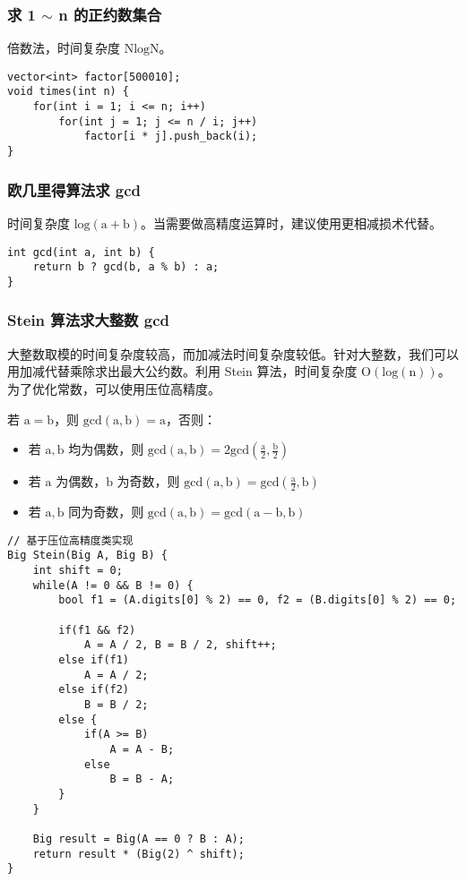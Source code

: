 \documentclass[UTF8]{article}
\begin{document}
\subsubsection{求 1 $\sim$ n 的正约数集合}
倍数法，时间复杂度 $\mathrm{NlogN}$。
\begin{lstlisting}[caption=倍数法求 1 $\sim$ n 的正约数集合]
vector<int> factor[500010];
void times(int n) {
    for(int i = 1; i <= n; i++)
        for(int j = 1; j <= n / i; j++)
            factor[i * j].push_back(i);
}
\end{lstlisting}

\subsubsection{欧几里得算法求 gcd}
时间复杂度 $\mathrm{log(a + b)}$。当需要做高精度运算时，建议使用更相减损术代替。
\begin{lstlisting}[caption=欧几里得算法求 gcd]
int gcd(int a, int b) {
	return b ? gcd(b, a % b) : a;
}
\end{lstlisting}

\subsubsection{Stein 算法求大整数 gcd}
大整数取模的时间复杂度较高，而加减法时间复杂度较低。针对大整数，我们可以用加减代替乘除求出最大公约数。利用 Stein 算法，时间复杂度 $\mathrm{O(log(n))}$。为了优化常数，可以使用压位高精度。

若 $\mathrm{a = b}$，则 $\mathrm{gcd(a,b) = a}$，否则：
\begin{itemize}
\item 若 $\mathrm{a,b}$ 均为偶数，则 $\mathrm{gcd(a,b) = 2 gcd(\frac{a}{2}, \frac{b}{2})}$
\item 若 $\mathrm{a}$ 为偶数，$\mathrm{b}$ 为奇数，则 $\mathrm{gcd(a,b) = gcd(\frac{a}{2}, b)}$
\item 若 $\mathrm{a,b}$ 同为奇数，则 $\mathrm{gcd(a,b) = gcd(a -b, b)}$
\end{itemize}
\begin{lstlisting}[caption=Stein 算法]
// 基于压位高精度类实现
Big Stein(Big A, Big B) {
    int shift = 0;
    while(A != 0 && B != 0) {
        bool f1 = (A.digits[0] % 2) == 0, f2 = (B.digits[0] % 2) == 0;

        if(f1 && f2) 
            A = A / 2, B = B / 2, shift++;
        else if(f1)
            A = A / 2;
        else if(f2) 
            B = B / 2;
        else {
            if(A >= B)
                A = A - B;
            else
                B = B - A;
        }
    }

    Big result = Big(A == 0 ? B : A);
	return result * (Big(2) ^ shift);
}
\end{lstlisting}
\end{document}
